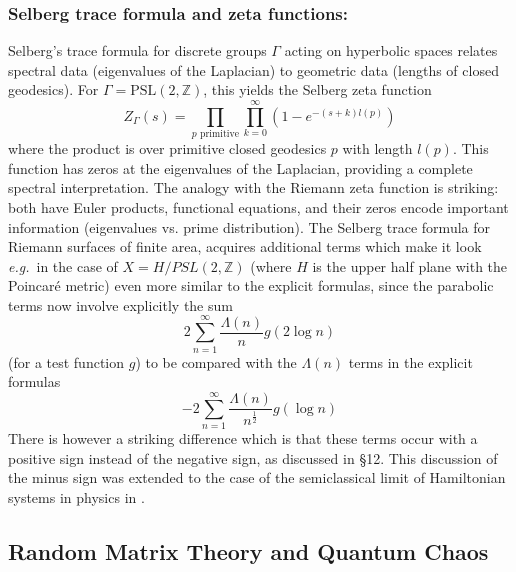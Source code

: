 \documentclass{article}
\newcommand{\eg}{{\it e.g.\/}\ }
\def\Z{{\mathbb Z}}
\begin{document}
   \subsubsection{Selberg trace formula and zeta functions:} Selberg's trace formula \cite{SelbergTrace1,Hejhal} for discrete groups $\Gamma$ acting on hyperbolic spaces relates spectral data (eigenvalues of the Laplacian) to geometric data (lengths of closed geodesics). For $\Gamma = \mathrm{PSL}(2,\mathbb{Z})$, this yields the Selberg zeta function
    \[
    Z_{\Gamma}(s) = \prod_{p \text{ primitive}} \prod_{k=0}^{\infty} (1 - e^{-(s+k)l(p)})
    \]
    where the product is over primitive closed geodesics $p$ with length $l(p)$. This function has zeros at the eigenvalues of the Laplacian, providing a complete spectral interpretation. The analogy with the Riemann zeta function is striking: both have Euler products, functional equations, and their zeros encode important information (eigenvalues vs. prime distribution). The Selberg  trace formula for Riemann surfaces of finite area, acquires additional terms which make it look \eg in the case of $X=H/PSL(2,\Z)$ (where $H$ is the upper half plane with the Poincar\'e metric) even more similar to the explicit formulas, since the parabolic terms now involve explicitly the sum $$2\sum_{n=1}^\infty \frac{\Lambda(n)}{n}g(2\log n)$$  
(for a test function $g$) to be compared with   the $\Lambda(n)$ terms in the explicit formulas 
$$
-2\sum_{n=1}^\infty \frac{\Lambda(n)}{n^{\frac 12}}g(\log n)
$$
There is however a striking difference which is that these terms occur with a positive sign instead  of the   negative sign, as discussed in \cite{Hejhal} \S 12. This discussion of the minus sign was extended to the case of the semiclassical limit of Hamiltonian
systems in physics in \cite{BerryKeatingChaos}.

\subsection{Random Matrix Theory and Quantum Chaos}
\end{document}
